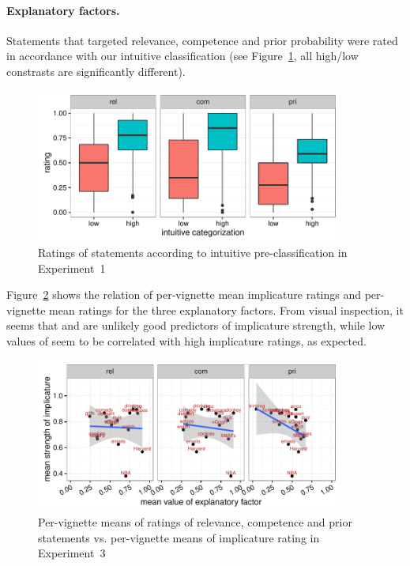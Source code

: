 \documentclass[12pt]{article}
\begin{document}
\paragraph{Explanatory factors.} Statements that targeted relevance, competence and prior
probability were rated in accordance with our intuitive classification (see
Figure~\ref{fig:factorBoxPlotsExp3}, all high/low constrasts are significantly different).

\begin{figure}
  \centering

  \includegraphics[width = 0.9\textwidth]{pics/factorBoxPlotExp3.pdf}
  
  \caption{Ratings of statements according to intuitive pre-classification in Experiment~1}
  \label{fig:factorBoxPlotsExp3}
\end{figure}

Figure~\ref{fig:correlationsExp3} shows the relation of per-vignette mean implicature ratings
and per-vignette mean ratings for the three explanatory factors. From visual inspection, it
seems that \rel and \com are unlikely good predictors of implicature strength, while low values
of \pri seem to be correlated with high implicature ratings, as expected.

\begin{figure}
  \centering

  \includegraphics[width = 0.9\textwidth]{pics/correlationExp3.pdf}
  
  \caption{Per-vignette means of ratings of relevance, competence and prior statements
    vs. per-vignette means of implicature rating in Experiment~3}
  \label{fig:correlationsExp3}
\end{figure}
\end{document}
